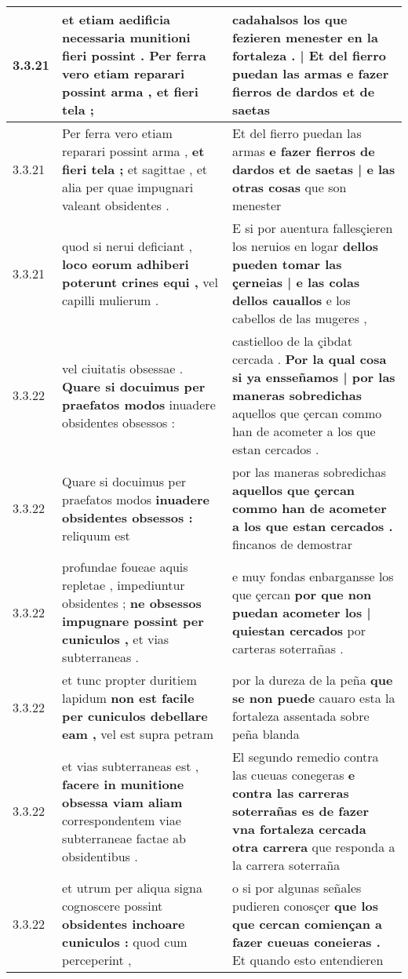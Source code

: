 \begin{tabular}{|p{1cm}|p{6.5cm}|p{6.5cm}|}
3.3.21 & et etiam aedificia necessaria munitioni fieri possint . \textbf{ Per ferra vero etiam reparari possint arma , } et fieri tela ; & cadahalsos \textbf{ los que fezieren menester en la fortaleza . | Et del fierro puedan las armas } e fazer fierros de dardos et de saetas \\\hline
3.3.21 & Per ferra vero etiam reparari possint arma , \textbf{ et fieri tela ; } et sagittae , et alia per quae impugnari valeant obsidentes . & Et del fierro puedan las armas \textbf{ e fazer fierros de dardos et de saetas | e las otras cosas } que son menester \\\hline
3.3.21 & quod si nerui deficiant , \textbf{ loco eorum adhiberi poterunt crines equi , } vel capilli mulierum . & E si por auentura fallesçieren los neruios en logar \textbf{ dellos pueden tomar las çerneias | e las colas dellos cauallos } e los cabellos de las mugeres , \\\hline
3.3.22 & vel ciuitatis obsessae . \textbf{ Quare si docuimus per praefatos modos } inuadere obsidentes obsessos : & castielloo de la çibdat cercada . \textbf{ Por la qual cosa si ya ensseñamos | por las maneras sobredichas } aquellos que çercan commo han de acometer a los que estan cercados . \\\hline
3.3.22 & Quare si docuimus per praefatos modos \textbf{ inuadere obsidentes obsessos : } reliquum est & por las maneras sobredichas \textbf{ aquellos que çercan commo han de acometer a los que estan cercados . } fincanos de demostrar \\\hline
3.3.22 & profundae foueae aquis repletae , impediuntur obsidentes ; \textbf{ ne obsessos impugnare possint per cuniculos , } et vias subterraneas . & e muy fondas enbargansse los que çercan \textbf{ por que non puedan acometer los | quiestan cercados } por carteras soterrañas . \\\hline
3.3.22 & et tunc propter duritiem lapidum \textbf{ non est facile per cuniculos debellare eam , } vel est supra petram & por la dureza de la peña \textbf{ que se non puede } cauaro esta la fortaleza assentada sobre peña blanda \\\hline
3.3.22 & et vias subterraneas est , \textbf{ facere in munitione obsessa viam aliam } correspondentem viae subterraneae factae ab obsidentibus . & El segundo remedio contra las cueuas conegeras \textbf{ e contra las carreras soterrañas es de fazer vna fortaleza cercada otra carrera } que responda a la carrera soterraña \\\hline
3.3.22 & et utrum per aliqua signa cognoscere possint \textbf{ obsidentes inchoare cuniculos : } quod cum perceperint , & o si por algunas señales pudieren conosçer \textbf{ que los que cercan comiençan a fazer cueuas coneieras . } Et quando esto entendieren \\\hline

\end{tabular}
